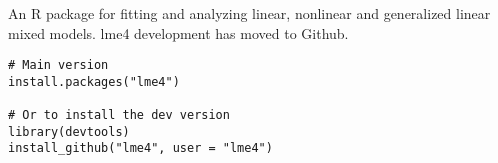 

An R package for fitting and analyzing linear, nonlinear and generalized linear mixed models. 
lme4 development has moved to Github.

\begin{verbatim}
# Main version
install.packages("lme4")

# Or to install the dev version
library(devtools)
install_github("lme4", user = "lme4")
\end{verbatim}

